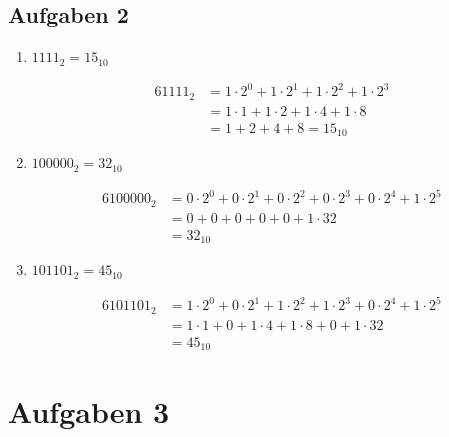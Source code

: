 \subsection*{Aufgaben 2}

\begin{enumerate}
\item  $1111_2 = 15_{10}$

\begin{alignat*}{6}
1111_2 &= 1 \cdot 2^0 + 1 \cdot 2^1 + 1 \cdot 2^2 + 1 \cdot 2^3 \\
& = 1 \cdot 1 + 1 \cdot 2 + 1 \cdot 4 + 1 \cdot 8 \\
& = 1 + 2 + 4 + 8 = 15_{10}
\end{alignat*}

\item $100000_2 = 32_{10}$

\begin{alignat*}{6}
100000_2 &= 0 \cdot 2^0 + 0 \cdot 2^1 + 0 \cdot 2^2 + 0 \cdot 2^3 + 0 \cdot 2^4 + 1 \cdot 2^5 \\
& = 0 + 0 + 0 + 0 + 0 + 1 \cdot 32 \\
& = 32_{10}
\end{alignat*}

\item $101101_2 = 45_{10}$

\begin{alignat*}{6}
101101_2 &= 1 \cdot 2^0 + 0 \cdot 2^1 + 1 \cdot 2^2 + 1 \cdot 2^3 + 0 \cdot 2^4 + 1 \cdot 2^5 \\
& = 1 \cdot 1 + 0 + 1 \cdot 4 + 1 \cdot 8 + 0 + 1 \cdot 32 \\
& = 45_{10}
\end{alignat*}

\end{enumerate}

\section*{Aufgaben 3}

